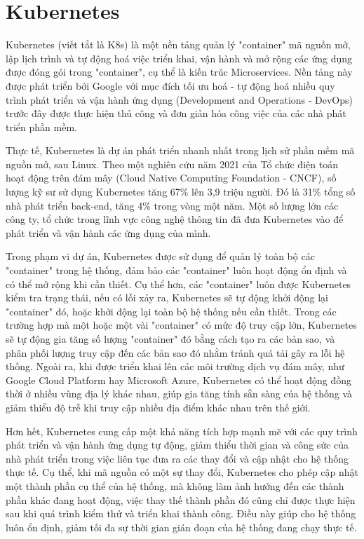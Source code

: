 \documentclass[../DoAn.tex]{subfiles}
\begin{document}
\section{Kubernetes}
\label{section:3.2}
Kubernetes (viết tắt là K8s) là một nền tảng quản lý "container" mã nguồn mở, lập lịch trình và tự động hoá việc triển khai, vận hành và mở rộng các ứng dụng được đóng gói
trong "container", cụ thể là kiến trúc Microservices. Nền tảng này được phát triển bởi Google với mục đích tối ưu hoá - tự động hoá nhiều quy trình phát triển và vận hành ứng dụng
(Development and Operations - DevOps) trước đây được thực hiện thủ công và đơn giản hóa công việc của các nhà phát triển phần mềm.

Thực tế, Kubernetes là dự án phát triển nhanh nhất trong lịch sử phần mềm mã nguồn mở, sau Linux. Theo một nghiên cứu năm 2021 của Tổ chức điện toán hoạt động trên đám mây
(Cloud Native Computing Foundation - CNCF), số lượng kỹ sư sử dụng Kubernetes tăng 67\% lên 3,9 triệu người. Đó là 31\% tổng số nhà phát triển back-end,
tăng 4\% trong vòng một năm. Một số lượng lớn các công ty, tổ chức trong lĩnh vực công nghệ thông tin đã đưa Kubernetes vào để phát triển và vận hành các ứng dụng của mình.

Trong phạm vi dự án, Kubernetes được sử dụng để quản lý toàn bộ các "container" trong hệ thống, đảm bảo các "container" luôn hoạt động ổn định và có thể mở rộng khi cần thiết.
Cụ thể hơn, các "container" luôn được Kubernetes kiểm tra trạng thái, nếu có lỗi xảy ra, Kubernetes sẽ tự động khởi động lại "container" đó,
hoặc khởi động lại toàn bộ hệ thống nếu cần thiết. Trong các trường hợp mà một hoặc một vài "container" có mức độ truy cập lớn, Kubernetes sẽ tự động gia tăng số lượng "container" đó
bằng cách tạo ra các bản sao, và phân phối lượng truy cập đến các bản sao đó nhằm tránh quá tải gây ra lỗi hệ thống. Ngoài ra, khi được triển khai lên các môi trường dịch
vụ đám mây, như Google Cloud Platform hay Microsoft Azure, Kubernetes có thể hoạt động đồng thời ở nhiều vùng địa lý khác nhau, giúp gia tăng tính sẵn sàng của hệ thống và giảm thiểu
độ trễ khi truy cập nhiều địa điểm khác nhau trên thế giới.

Hơn hết, Kubernetes cung cấp một khả năng tích hợp mạnh mẽ với các quy trình phát triển và vận hành ứng dụng tự động, giảm thiểu thời gian và công sức của nhà phát triển trong việc
liên tục đưa ra các thay đổi và cập nhật cho hệ thống thực tế. Cụ thể, khi mã nguồn có một sự thay đổi, Kubernetes cho phép cập nhật một thành phần cụ thể của hệ thống, mà không làm ảnh hưởng
đến các thành phần khác đang hoạt động, việc thay thế thành phần đó cũng chỉ được thực hiện sau khi quá trình kiểm thử và triển khai thành công. Điều này giúp cho hệ thống luôn ổn định,
giảm tối đa sự thời gian gián đoạn của hệ thống đang chạy thực tế.
\end{document}
